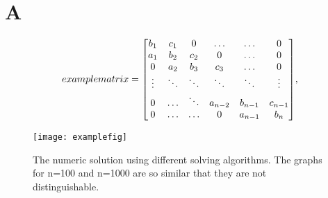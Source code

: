 \onecolumn
\setcounter{equation}{0}
\renewcommand\theequation{A.\arabic{equation}}
\section*{A}
\label{sec:appendix}

  \[examplematrix =
    \mqty[b_1 & c_1 & 0 & \hdots & \hdots & 0 \\
          a_1 & b_2 & c_2 & 0 & \hdots & 0 \\
          0 & a_2 & b_3 & c_3 & \hdots & 0 \\
          \vdots & \ddots & \ddots & \ddots & \ddots & \vdots \\
          0 & \hdots & \ddots & a_{n-2} & b_{n-1} & c_{n-1} \\
          0 & \hdots & \hdots & 0 & a_{n-1} & b_n],
  \]

\begin{figure}[htbp]
	\centering
	\texttt{[image: examplefig]}
	\caption{The numeric solution using different solving algorithms. The graphs for n=100 and n=1000 are so similar that they are not distinguishable.}
	\label{fig:all}
\end{figure}

